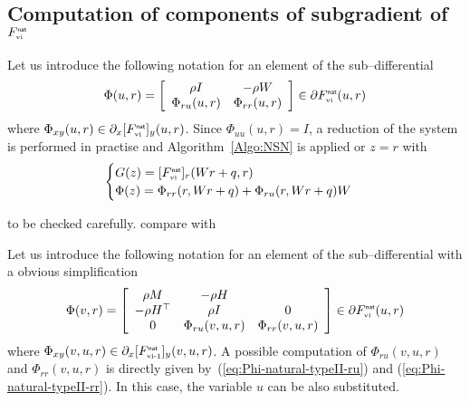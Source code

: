 \subsection{Computation of components of subgradient of $F_{{\hbox{\tiny{vi}}}}^{\hbox{\sf \tiny{nat}}}$}



 Let us introduce the following notation for an element of the sub--differential
\begin{equation}
  \label{eq:Phi-natural-typeII}
  \Phi(u, r)  = \left[
  \begin{array}{cc}
    \rho  I  &   - \rho W \\
     \Phi_{r u}(u,r) &   \Phi_{r r}(u,r)
  \end{array}\right] \in \partial F_{\vitwo}^\nat(u,r)
\end{equation}
where $ \Phi_{x y}(u,r) \in \partial_{x}[F_{{\hbox{\tiny{vi}}}}^{\hbox{\sf \tiny{nat}}}]_{y}(u,r)$. Since $\Phi_{u u}(u,r) = I $, a reduction of the system is performed in practise and Algorithm~\ref{Algo:NSN} is applied or $z =r$ with
\begin{equation}
  \label{eq:phiphi}
  \begin{cases}
    G(z) = [F_{\vitwo}^\nat]_{r}(Wr+q,r) \\
    \Phi(z) = \Phi_{rr}(r,Wr+q) + \Phi_{ru}(r,Wr+q) W
  \end{cases}
\end{equation}
\begin{ndrva}
  to be checked carefully. compare with \cite{Hayashi.ea_SIOPT2005}
\end{ndrva}

 Let us introduce the following notation for an element of the sub--differential with a obvious simplification
\begin{equation}
  \label{eq:Phi-natural-typeI}
  \Phi(v,  r)  = \left[
  \begin{array}{ccc}
   \rho M &  - \rho H  \\
   -\rho H^\top &  \rho I &   0  \\
   0  &   \Phi_{r u}(v,u,r) &   \Phi_{r r}(v,u,r)
 \end{array}\right] \in \partial F_{\vitwo}^\nat(u,r)
\end{equation}
where $ \Phi_{x y}(v,u,r) \in \partial_{x}[F_{{\hbox{\tiny{vi-1}}}}^{\hbox{\sf \tiny{nat}}}]_{y}(v,u,r)$. A possible computation of  $\Phi_{r u}(v,u,r)$ and $\Phi_{r r}(v,u,r) $ is directly given by~(\ref{eq:Phi-natural-typeII-ru}) and (\ref{eq:Phi-natural-typeII-rr}). In this case, the variable $u$ can be also substituted.







